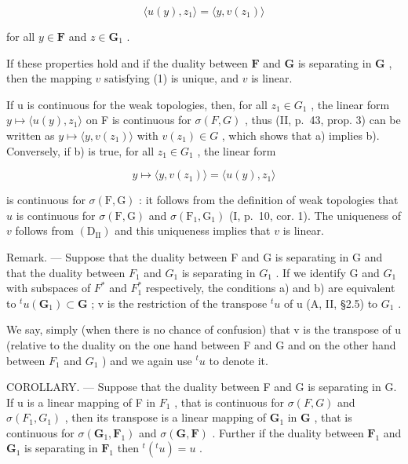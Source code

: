 \[
\langle u (y), z _ {1} \rangle = \langle y, v (z _ {1}) \rangle\tag{1}
\]

for all \(y \in \mathbf{F}\) and \(z \in \mathbf{G}_1\) .

If these properties hold and if the duality between \(\mathbf{F}\) and \(\mathbf{G}\) is separating in \(\mathbf{G}\) , then the mapping \(v\) satisfying (1) is unique, and \(v\) is linear.

If u is continuous for the weak topologies, then, for all \(z_{1} \in G_{1}\) , the linear form \(y \mapsto \langle u(y), z_{1} \rangle\) on F is continuous for \(\sigma(F, G)\) , thus (II, p.~43, prop. 3) can be written as \(y \mapsto \langle y, v(z_{1}) \rangle\) with \(v(z_{1}) \in G\) , which shows that a) implies b). Conversely, if b) is true, for all \(z_{1} \in G_{1}\) , the linear form

\[
y \mapsto \langle y, v (z _ {1}) \rangle = \langle u (y), z _ {1} \rangle
\]

is continuous for \(\sigma(\mathrm{F},\mathrm{G})\) : it follows from the definition of weak topologies that \(u\) is continuous for \(\sigma(\mathrm{F},\mathrm{G})\) and \(\sigma(\mathrm{F}_1,\mathrm{G}_1)\) (I, p.~10, cor. 1). The uniqueness of \(v\) follows from \((\mathrm{D}_{\mathrm{II}})\) and this uniqueness implies that \(v\) is linear.

Remark. --- Suppose that the duality between F and G is separating in G and that the duality between \(F_{1}\) and \(G_{1}\) is separating in \(G_{1}\) . If we identify G and \(G_{1}\) with subspaces of \(F^{*}\) and \(F_{1}^{*}\) respectively, the conditions a) and b) are equivalent to \(^{t}u(\mathbf{G}_{1}) \subset \mathbf{G}\) ; v is the restriction of the transpose \(^{t}u\) of u (A, II, §2.5) to \(G_{1}\) .

We say, simply (when there is no chance of confusion) that v is the transpose of u (relative to the duality on the one hand between F and G and on the other hand between \(F_{1}\) and \(G_{1}\) ) and we again use \(^{t}u\) to denote it.

COROLLARY. --- Suppose that the duality between F and G is separating in G. If u is a linear mapping of F in \(F_{1}\) , that is continuous for \(\sigma(F, G)\) and \(\sigma(F_{1}, G_{1})\) , then its transpose is a linear mapping of \(\mathbf{G}_1\) in \(\mathbf{G}\) , that is continuous for \(\sigma (\mathbf{G}_1,\mathbf{F}_1)\) and \(\sigma (\mathbf{G},\mathbf{F})\) . Further if the duality between \(\mathbf{F}_1\) and \(\mathbf{G}_1\) is separating in \(\mathbf{F}_1\) then \(^{t}(^{t} u) = u\) .


